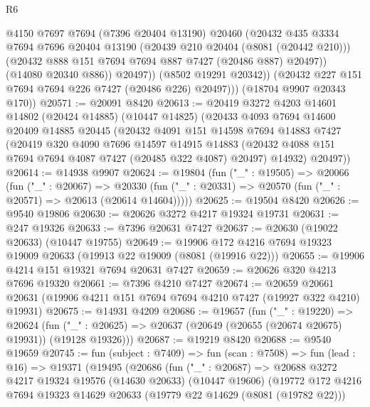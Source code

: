 \begin{lexlean}{R6}
\begin{coremodule}
                  @4150
                  @7697
                  @7694
                  (@7396 @20404 @13190)
                  @20460
                  (@20432
                    @435
                    @3334
                    @7694
                    @7696
                    @20404
                    @13190
                    (@20439 @210 @20404 (@8081 (@20442 @210)))
                    (@20432 @888 @151 @7694 @7694 @887 @7427 (@20486 @887) @20497))
                  (@14080 @20340 @886))
                @20497))
            (@8502 @19291 @20342))
          (@20432 @227 @151 @7694 @7694 @226 @7427 (@20486 @226) @20497)))
      (@18704 @9907 @20343 @170))
@20571 := @20091 @8420
@20613 := @20419
    @3272
    @4203
    @14601
    @14802
    (@20424 @14885)
    (@10447 @14825)
    (@20433
      @4093
      @7694
      @14600
      @20409
      @14885
      @20445
      (@20432
        @4091
        @151
        @14598
        @7694
        @14883
        @7427
        (@20419
          @320
          @4090
          @7696
          @14597
          @14915
          @14883
          (@20432 @4088 @151 @7694 @7694 @4087 @7427 (@20485 @322 @4087) @20497)
          @14932)
        @20497))
@20614 := @14938 @9907
@20624 := @19804
    (fun ("_" : @19505) =>
    @20066
      (fun ("_" : @20067) =>
      @20330 (fun ("_" : @20331) => @20570 (fun ("_" : @20571) => @20613 (@20614 @14604)))))
@20625 := @19504 @8420
@20626 := @9540 @19806
@20630 := @20626 @3272 @4217 @19324 @19731
@20631 := @247 @19326
@20633 := @7396 @20631 @7427
@20637 := @20630 (@19022 @20633) (@10447 @19755)
@20649 := @19906 @172 @4216 @7694 @19323 @19009 @20633 (@19913 @22 @19009 (@8081 (@19916 @22)))
@20655 := @19906 @4214 @151 @19321 @7694 @20631 @7427
@20659 := @20626 @320 @4213 @7696 @19320
@20661 := @7396 @4210 @7427
@20674 := @20659
    @20661
    @20631
    (@19906 @4211 @151 @7694 @7694 @4210 @7427 (@19927 @322 @4210) @19931)
@20675 := @14931 @4209
@20686 := @19657
    (fun ("_" : @19220) =>
    @20624 (fun ("_" : @20625) => @20637 (@20649 (@20655 (@20674 @20675) @19931)) (@19128 @19326)))
@20687 := @19219 @8420
@20688 := @9540 @19659
@20745 := fun (subject : @7409) =>
  fun (scan : @7508) =>
  fun (lead : @16) =>
  @19371
    (@19495
      (@20686
        (fun ("_" : @20687) =>
        @20688
          @3272
          @4217
          @19324
          @19576
          (@14630 @20633)
          (@10447 @19606)
          (@19772
            @172
            @4216
            @7694
            @19323
            @14629
            @20633
            (@19779 @22 @14629 (@8081 (@19782 @22)))

\end{coremodule}
\end{lexlean}
